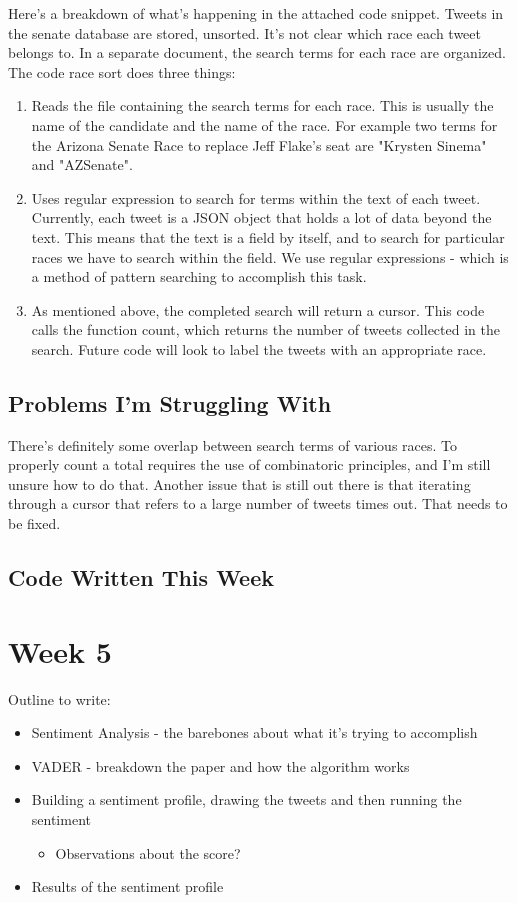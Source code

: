 \documentclass[11pt, twoside, reqno]{article}
\begin{document}
Here's a breakdown of what's happening in the attached code snippet. Tweets in the senate database are stored, unsorted. It's not clear which race each tweet belongs to. In a separate document, the search terms for each race are organized. The code race sort does three things:
\begin{enumerate}
	\item Reads the file containing the search terms for each race. This is usually the name of the candidate and the name of the race. For example two terms for the Arizona Senate Race to replace Jeff Flake's seat are "Krysten Sinema" and "AZSenate". 
	\item Uses regular expression to search for terms within the text of each tweet. Currently, each tweet is a JSON object that holds a lot of data beyond the text. This means that the text is a field by itself, and to search for particular races we have to search within the field. We use regular expressions - which is a method of pattern searching to accomplish this task. 
	\item As mentioned above, the completed search will return a cursor. This code calls the function count, which returns the number of tweets collected in the search. Future code will look to label the tweets with an appropriate race. 
\end{enumerate}

\subsection{Problems I'm Struggling With}
There's definitely some overlap between search terms of various races. To properly count a total requires the use of combinatoric principles, and I'm still unsure how to do that. Another issue that is still out there is that iterating through a cursor that refers to a large number of tweets times out. That needs to be fixed. 

\subsection{Code Written This Week}


\newpage

\section{Week 5}
Outline to write:
\begin{itemize}
	\item Sentiment Analysis - the barebones about what it's trying to accomplish
	\item VADER - breakdown the paper and how the algorithm works
	\item Building a sentiment profile, drawing the tweets and then running the sentiment
	\begin{itemize}
		\item Observations about the score?
	\end{itemize}
	\item Results of the sentiment profile
\end{itemize}
\end{document}
